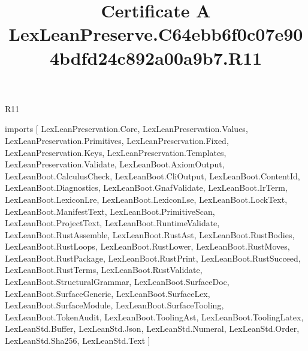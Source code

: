 \begin{lexlean}{R11}
\title{Certificate A LexLeanPreserve.C64ebb6f0c07e904bdfd24c892a00a9b7.R11}
\begin{coremodule}
imports [
  LexLeanPreservation.Core,
  LexLeanPreservation.Values,
  LexLeanPreservation.Primitives,
  LexLeanPreservation.Fixed,
  LexLeanPreservation.Keys,
  LexLeanPreservation.Templates,
  LexLeanPreservation.Validate,
  LexLeanBoot.AxiomOutput,
  LexLeanBoot.CalculusCheck,
  LexLeanBoot.CliOutput,
  LexLeanBoot.ContentId,
  LexLeanBoot.Diagnostics,
  LexLeanBoot.GnafValidate,
  LexLeanBoot.IrTerm,
  LexLeanBoot.LexiconLre,
  LexLeanBoot.LexiconLse,
  LexLeanBoot.LockText,
  LexLeanBoot.ManifestText,
  LexLeanBoot.PrimitiveScan,
  LexLeanBoot.ProjectText,
  LexLeanBoot.RuntimeValidate,
  LexLeanBoot.RustAssemble,
  LexLeanBoot.RustAst,
  LexLeanBoot.RustBodies,
  LexLeanBoot.RustLoops,
  LexLeanBoot.RustLower,
  LexLeanBoot.RustMoves,
  LexLeanBoot.RustPackage,
  LexLeanBoot.RustPrint,
  LexLeanBoot.RustSucceed,
  LexLeanBoot.RustTerms,
  LexLeanBoot.RustValidate,
  LexLeanBoot.StructuralGrammar,
  LexLeanBoot.SurfaceDoc,
  LexLeanBoot.SurfaceGeneric,
  LexLeanBoot.SurfaceLex,
  LexLeanBoot.SurfaceModule,
  LexLeanBoot.SurfaceTooling,
  LexLeanBoot.TokenAudit,
  LexLeanBoot.ToolingAst,
  LexLeanBoot.ToolingLatex,
  LexLeanStd.Buffer,
  LexLeanStd.Json,
  LexLeanStd.Numeral,
  LexLeanStd.Order,
  LexLeanStd.Sha256,
  LexLeanStd.Text
]


\end{coremodule}
\end{lexlean}
